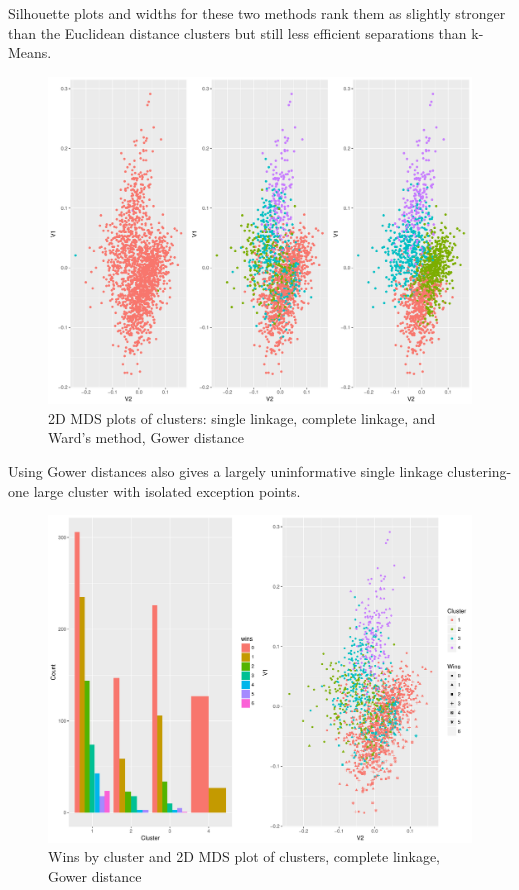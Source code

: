 \documentclass[10pt,a4paper, hidelinks]{article} %
\begin{document}
Silhouette plots and widths for these two methods rank them as slightly stronger than the Euclidean distance clusters but still less efficient separations than k-Means.

\begin{figure}[H]
	\centering
	\includegraphics[width=0.7\linewidth]{"../fig/gower"}
	\caption{2D MDS plots of clusters: single linkage, complete linkage, and Ward's method, Gower distance}
\end{figure}

Using Gower distances also gives a largely uninformative single linkage clustering- one large cluster with isolated exception points.

\begin{figure}[H]
	\centering
	\includegraphics[width=0.7\linewidth]{../fig/comp3}
	\caption{Wins by cluster and 2D MDS plot of clusters, complete linkage, Gower distance}
\end{figure}
\end{document}
